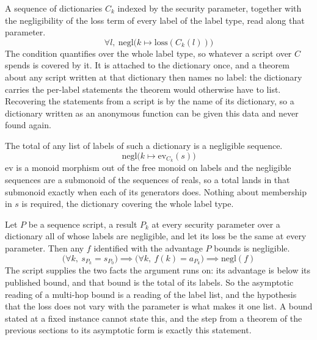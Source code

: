 \begin{definition}
  \label{def:negligible_claims}
  \rocqok
  A sequence of dictionaries $C_k$ indexed by the security parameter, together
  with the negligibility of the loss term of every label of the label type, read
  along that parameter.
  \[ \forall l,\ \mathrm{negl}\big(k \mapsto \mathrm{loss}(C_k(l))\big) \]
  The condition quantifies over the whole label type, so whatever a script
  over $C$ spends is covered by it. It is attached to the dictionary once, and
  a theorem about any script written at that dictionary then names no label:
  the dictionary carries the per-label statements the theorem would otherwise
  have to list. Recovering the statements from a script is by the name of its
  dictionary, so a dictionary
  written as an anonymous function can be given this data and never found
  again.
\end{definition}

\begin{lemma}
  \label{lem:loss_eval_negligible}
  \rocqok
  The total of any list of labels of such a dictionary is a negligible
  sequence.
  \[ \mathrm{negl}\big(k \mapsto \mathrm{ev}_{C_k}(s)\big) \]
  $\mathrm{ev}$ is a monoid morphism out of the free monoid on labels and the
  negligible sequences are a submonoid of the sequences of reals, so a total
  lands in that submonoid exactly when each of its generators does. Nothing
  about membership in $s$ is required, the dictionary covering the whole label
  type.
\end{lemma}

\begin{theorem}
  \label{thm:advantage_negligible}
  \rocqok
  Let $P$ be a sequence script, a result $P_k$ at every security parameter
  over a dictionary all of whose labels are negligible, and let its loss be the
  same at every parameter.
  Then any $f$ identified with the advantage $P$ bounds is negligible.
  \[ \big(\forall k,\ s_{P_k} = s_{P_0}\big) \implies
     \big(\forall k,\ f(k) = a_{P_k}\big) \implies \mathrm{negl}(f) \]
  The script supplies the two facts the argument runs on: its advantage is
  below its published bound, and that bound is the total of its labels. So the
  asymptotic reading of a multi-hop bound is a reading of the label list, and
  the hypothesis that the loss does not vary with the parameter is what makes
  it one list. A bound stated at a fixed instance cannot state this, and the
  step from a theorem of the previous sections to its asymptotic form is
  exactly this statement.
\end{theorem}

